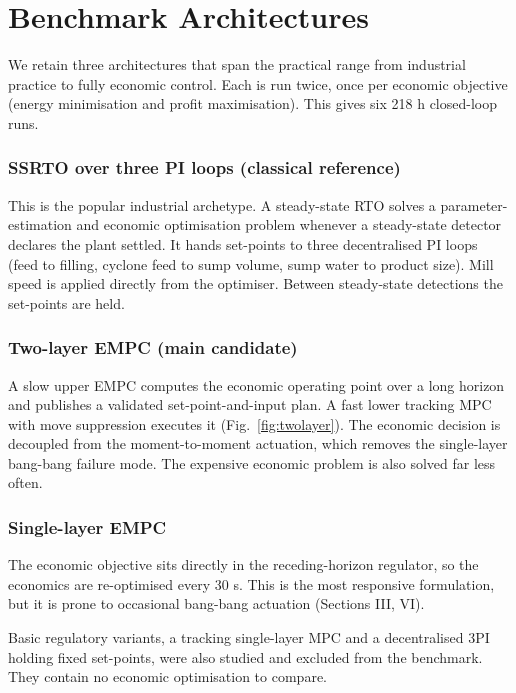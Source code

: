 \documentclass[conference]{IEEEtran}
\begin{document}
\section{Benchmark Architectures}

We retain three architectures that span the practical range from industrial
practice to fully economic control. Each is run twice,
once per economic objective (energy minimisation and profit maximisation).
This gives six 218 h closed-loop runs.

\subsubsection{SSRTO over three PI loops (classical reference)}
This is the popular industrial archetype. A steady-state RTO solves a
parameter-estimation and economic optimisation problem whenever a
steady-state detector declares the plant settled. It hands set-points to
three decentralised PI loops (feed to filling, cyclone feed to sump
volume, sump water to product size). Mill speed is applied directly from
the optimiser. Between steady-state detections the set-points are held.

\subsubsection{Two-layer EMPC (main candidate)}
A slow upper EMPC computes the economic operating point over a long
horizon and publishes a validated set-point-and-input plan. A fast lower
tracking MPC with move suppression executes it (Fig.~\ref{fig:twolayer}).
The economic decision is decoupled from the moment-to-moment actuation,
which removes the single-layer bang-bang failure mode. The expensive
economic problem is also solved far less often.

\subsubsection{Single-layer EMPC}
The economic objective sits directly in the receding-horizon regulator, so
the economics are re-optimised every 30 s. This is the most
responsive formulation, but it is prone to occasional bang-bang
actuation (Sections III, VI).

Basic regulatory variants, a tracking
single-layer MPC and a decentralised 3PI holding fixed set-points, were
also studied and excluded from the benchmark. They contain no economic
optimisation to compare.
\end{document}

